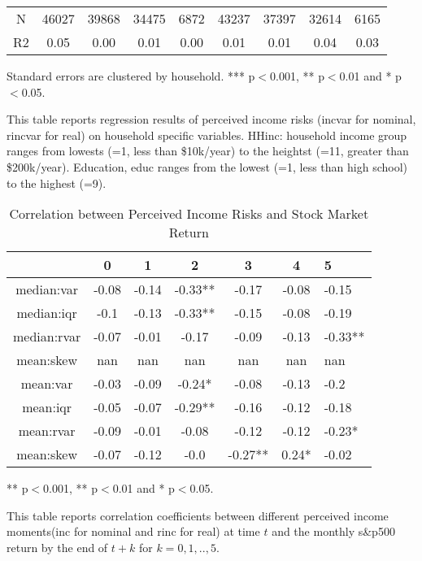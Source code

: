 \documentclass[12pt,notitlepage,onecolumn,aps,pra]{article}
\begin{document}
\begin{table}[ht]
\begin{adjustbox}{width={0.9\textwidth},totalheight={\textheight}}
\begin{threeparttable}
\begin{tabular}{ccccccccc}
N            &    46027 &     39868 &      34475 &        6872 &     43237 &      37397 &       32614 &         6165 \\
R2           &     0.05 &      0.00 &       0.01 &        0.00 &      0.01 &       0.01 &        0.04 &         0.03 \\
\bottomrule
\end{tabular}
\begin{tablenotes}\item Standard errors are clustered by household. *** p$<$0.001, ** p$<$0.01 and * p$<$0.05. 
\item This table reports regression results of perceived income risks (incvar for nominal, rincvar for real) on household specific variables. HHinc: household income group ranges from lowests (=1, less than \$10k/year) to the heightst (=11, greater than \$200k/year). Education, educ ranges from the lowest (=1, less than high school) to the highest (=9).
\end{tablenotes}
\end{threeparttable}
\end{adjustbox}
\end{table}
\begin{table}[ht]
\centering
\begin{threeparttable}
\caption{Correlation between Perceived Income Risks and Stock Market Return}
\label{macro_corr}\begin{tabular}{ccccccl}
\toprule
{} &      0 &      1 &        2 &        3 &      4 &        5 \\
\midrule
median:var  &  -0.08 &  -0.14 &  -0.33** &    -0.17 &  -0.08 &    -0.15 \\
median:iqr  &   -0.1 &  -0.13 &  -0.33** &    -0.15 &  -0.08 &    -0.19 \\
median:rvar &  -0.07 &  -0.01 &    -0.17 &    -0.09 &  -0.13 &  -0.33** \\
mean:skew   &    nan &    nan &      nan &      nan &    nan &      nan \\
mean:var    &  -0.03 &  -0.09 &   -0.24* &    -0.08 &  -0.13 &     -0.2 \\
mean:iqr    &  -0.05 &  -0.07 &  -0.29** &    -0.16 &  -0.12 &    -0.18 \\
mean:rvar   &  -0.09 &  -0.01 &    -0.08 &    -0.12 &  -0.12 &   -0.23* \\
mean:skew   &  -0.07 &  -0.12 &     -0.0 &  -0.27** &  0.24* &    -0.02 \\
\bottomrule
\end{tabular}
\begin{tablenotes}
\item *** p$<$0.001, ** p$<$0.01 and * p$<$0.05. 
\item This table reports correlation coefficients between different perceived income moments(inc for nominal 
and rinc for real) at time 
$t$ and the monthly s\&p500 return by the end of $t+k$ for $k=0,1,..,5$. 
\end{tablenotes}
\end{threeparttable}
\end{table}       %
    
    



    
    
\end{document}
